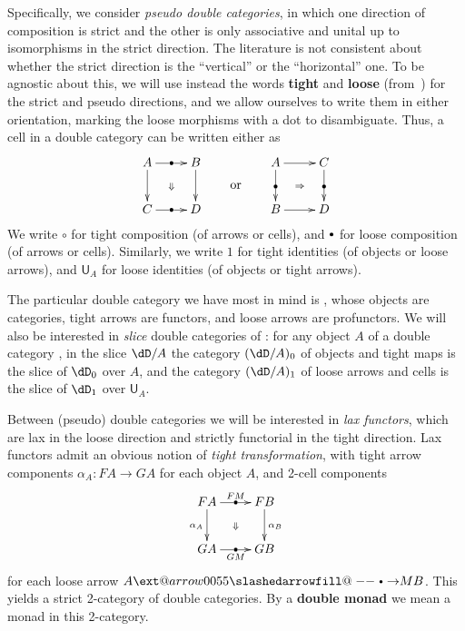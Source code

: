 \documentclass{amsart}
\makeatletter
\def\rightbulletarrowfill@{%
  \slashedarrowfill@\relbar\relbar{\raisebox{1.25pt}{$\scriptscriptstyle\bullet$}}\rightarrow}
\newcommand\xbulletrightarrow[2][]{%
  \ext@arrow 0055{\rightbulletarrowfill@}{#1}{#2}}
\let\xbto\xbulletrightarrow
\newcommand{\bcomp}{\mathbin{\raisebox{1pt}{\scriptsize$\bullet$}}}
\newcommand{\hunit}[1]{\mathsf{U}_{#1}}
\makeatother
\begin{document}
Specifically, we consider \emph{pseudo double categories}, in which one direction of composition is strict and the other is only associative and unital up to isomorphisms in the strict direction.
The literature is not consistent about whether the strict direction is the ``vertical'' or the ``horizontal'' one.
To be agnostic about this, we will use instead the words \textbf{tight} and \textbf{loose} (from~\cite{ls:limlax}) for the strict and pseudo directions, and we allow ourselves to write them in either orientation, marking the loose morphisms with a dot to disambiguate.
Thus, a cell in a double category can be written either as
\[ \vcenter{\xymatrix{ A \ar[r]|{\bullet} \ar[d] \ar@{}[dr]|{\Downarrow}& B \ar[d] \\ C \ar[r]|{\bullet} & D } }
\qquad\text{or}\qquad
\vcenter{\xymatrix{ A \ar[d]|{\bullet} \ar[r] \ar@{}[dr]|{\Rightarrow}& C \ar[d]|{\bullet} \\ B \ar[r] & D } }
\]
We write $\circ$ for tight composition (of arrows or cells), and $\bcomp$ for loose composition (of arrows or cells).
Similarly, we write $1$ for tight identities (of objects or loose arrows), and $\hunit{A}$ for loose identities (of objects or tight arrows).

The particular double category we have most in mind is \dCat, whose objects are categories, tight arrows are functors, and loose arrows are profunctors.
We will also be interested in \emph{slice} double categories of \dCat: for any object $A$ of a double category \dD, in the slice $\dD/A$ the category $(\dD/A)_0$ of objects and tight maps is the slice of $\dD_0$ over $A$, and the category $(\dD/A)_1$ of loose arrows and cells is the slice of $\dD_1$ over $\hunit A$.

Between (pseudo) double categories we will be interested in \emph{lax functors}, which are lax in the loose direction and strictly functorial in the tight direction.
Lax functors admit an obvious notion of \emph{tight transformation}, with tight arrow components $\alpha_A:FA\to GA$ for each object $A$, and 2-cell components
\[ \vcenter{\xymatrix{ FA \ar[r]|{\bullet}^{FM} \ar[d]_{\alpha_A} \ar@{}[dr]|{\Downarrow}& FB \ar[d]^{\alpha_B} \\ GA \ar[r]|{\bullet}_{GM} & GB } } \]
for each loose arrow $A\xbto{M} B$.
This yields a strict 2-category of double categories.
By a \textbf{double monad} we mean a monad in this 2-category.
\end{document}
